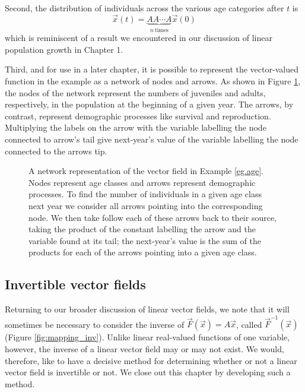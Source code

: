 \documentclass[../book.tex]{subfiles}
\begin{document}
Second, the distribution of individuals across the various age categories after \(t\) is
\begin{equation}\label{eq:vec-37}
\vec{x}(t) = \underbrace{A  A  \cdots A}_{n\ \text{times}}  \vec{x}(0)
\end{equation}
which is reminiscent of a result we encountered in our discussion of linear population growth in Chapter 1.

Third, and for use in a later chapter, it is possible to represent the vector-valued function in the example as a network of nodes and arrows. As shown in Figure \ref{fig:transition-diagram}, the nodes of the network represent the numbers of juveniles and adults, respectively, in the population at the beginning of a given year. The arrows, by contrast, represent demographic processes like survival and reproduction. Multiplying the labels on the arrow with the variable labelling the node connected to arrow's tail give next-year's value of the variable labelling the node connected to the arrows tip.

\begin{figure}[htbp]
  \centering
  \caption{A network representation of the vector field in Example \ref{eg.age}. Nodes represent age classes and arrows represent demographic processes. To find the number of individuals in a given age class next year we consider all arrows pointing into the corresponding node. We then take  follow each of these arrows back to their source, taking the product of the constant labelling the arrow and the variable found at its tail; the next-year's value is the sum of the products for each of the arrows pointing into a given age class.}
  \label{fig:transition-diagram}
\end{figure}

\subsection{Invertible vector fields}

Returning to our broader discussion of linear vector fields, we note that it will sometimes be necessary to consider the inverse of \(\vec{F}(\vec{x}) = A \vec{x}\), called \(\vec{F}^{-1}(\vec{x})\) (Figure \ref{fig:mapping_inv}). Unlike linear real-valued functions of one variable, however, the inverse of a linear vector field may or may not exist. We would, therefore, like to have a decisive method for determining whether or not a linear vector field is invertible or not. We close out this chapter by developing such a method.
\end{document}

